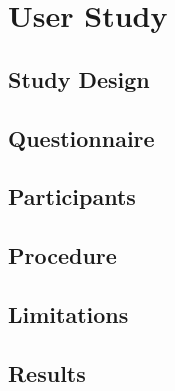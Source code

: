 \label{ch:study}
\section{User Study}

\subsection{Study Design}
\subsection{Questionnaire}
\subsection{Participants}
\subsection{Procedure}
\subsection{Limitations}
\subsection{Results}

